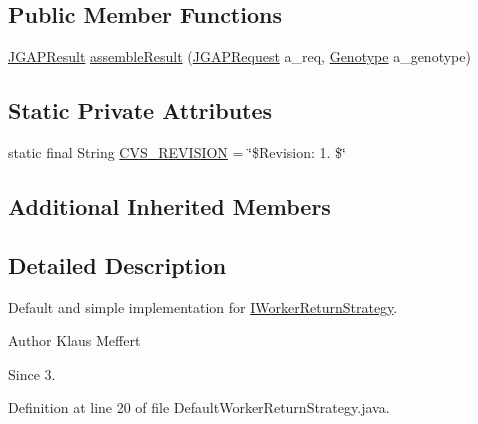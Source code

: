 \subsection*{Public Member Functions}
\begin{DoxyCompactItemize}
\item 
\hyperlink{classorg_1_1jgap_1_1distr_1_1grid_1_1_j_g_a_p_result}{J\-G\-A\-P\-Result} \hyperlink{classorg_1_1jgap_1_1distr_1_1grid_1_1_default_worker_return_strategy_ac5a447324c0bcd0f2915fb57b894f3c5}{assemble\-Result} (\hyperlink{classorg_1_1jgap_1_1distr_1_1grid_1_1_j_g_a_p_request}{J\-G\-A\-P\-Request} a\-\_\-req, \hyperlink{classorg_1_1jgap_1_1_genotype}{Genotype} a\-\_\-genotype)
\end{DoxyCompactItemize}
\subsection*{Static Private Attributes}
\begin{DoxyCompactItemize}
\item 
static final String \hyperlink{classorg_1_1jgap_1_1distr_1_1grid_1_1_default_worker_return_strategy_a401dec374d5fcc23da53a850f3bc1700}{C\-V\-S\-\_\-\-R\-E\-V\-I\-S\-I\-O\-N} = \char`\"{}\$Revision\-: 1. \$\char`\"{}
\end{DoxyCompactItemize}
\subsection*{Additional Inherited Members}


\subsection{Detailed Description}
Default and simple implementation for \hyperlink{interfaceorg_1_1jgap_1_1distr_1_1grid_1_1_i_worker_return_strategy}{I\-Worker\-Return\-Strategy}.

\begin{DoxyAuthor}{Author}
Klaus Meffert 
\end{DoxyAuthor}
\begin{DoxySince}{Since}
3. 
\end{DoxySince}


Definition at line 20 of file Default\-Worker\-Return\-Strategy.\-java.



